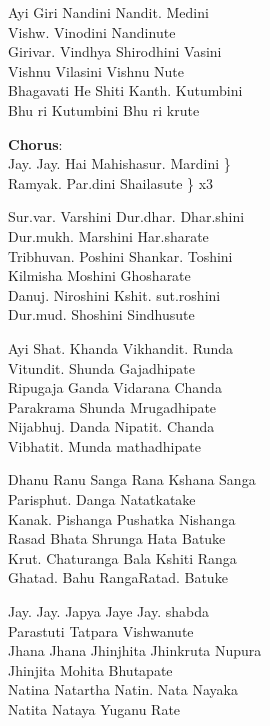 
Ayi Giri Nandini Nandit. Medini \\
Vishw. Vinodini Nandinute \\
Girivar. Vindhya Shirodhini Vasini \\
Vishnu Vilasini Vishnu Nute \\
Bhagavati He Shiti Kanth. Kutumbini \\
Bhu ri Kutumbini Bhu ri krute  \linebreak[2]

{\bf Chorus}: \\
Jay. Jay. Hai Mahishasur. Mardini \} \\
Ramyak. Par.dini Shailasute \} x3 \linebreak[2]

Sur.var. Varshini Dur.dhar. Dhar.shini \\
Dur.mukh. Marshini Har.sharate \\ 
Tribhuvan. Poshini Shankar. Toshini \\
Kilmisha Moshini Ghosharate \\
Danuj. Niroshini Kshit. sut.roshini \\
Dur.mud. Shoshini Sindhusute \linebreak[2]

Ayi Shat. Khanda Vikhandit. Runda \\
Vitundit. Shunda Gajadhipate \\
Ripugaja Ganda Vidarana Chanda \\
Parakrama Shunda Mrugadhipate \\
Nijabhuj. Danda Nipatit. Chanda \\
Vibhatit. Munda mathadhipate \linebreak[2]

Dhanu Ranu Sanga Rana Kshana Sanga \\
Parisphut. Danga Natatkatake \\
Kanak. Pishanga Pushatka Nishanga \\
Rasad Bhata Shrunga Hata Batuke \\
Krut. Chaturanga Bala Kshiti Ranga \\
Ghatad. Bahu RangaRatad. Batuke \linebreak[2]

Jay. Jay. Japya Jaye Jay. shabda \\
Parastuti Tatpara Vishwanute \\
Jhana Jhana Jhinjhita Jhinkruta Nupura \\
Jhinjita Mohita Bhutapate \\
Natina Natartha Natin. Nata Nayaka \\
Natita Nataya Yuganu Rate \linebreak[2]

